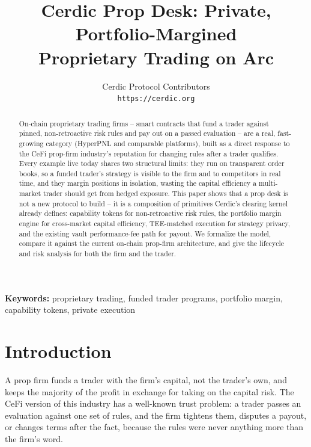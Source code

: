 \documentclass[11pt,a4paper]{article}
\title{
  \vspace{-1.5cm}
  \textbf{Cerdic Prop Desk: Private, Portfolio-Margined\\[4pt]
  Proprietary Trading on Arc}
  \vspace{-0.3cm}
}
\author{
  Cerdic Protocol Contributors\\[4pt]
  \texttt{https://cerdic.org}
}
\date{}
\begin{document}
\maketitle
\thispagestyle{empty}
\vspace{0.3cm}

\begin{abstract}
  \noindent On-chain proprietary trading firms -- smart contracts that fund a trader
  against pinned, non-retroactive risk rules and pay out on a passed evaluation -- are a
  real, fast-growing category (HyperPNL and comparable platforms), built as a direct
  response to the CeFi prop-firm industry's reputation for changing rules after a trader
  qualifies. Every example live today shares two structural limits: they run on transparent
  order books, so a funded trader's strategy is visible to the firm and to competitors
  in real time, and they margin positions in isolation, wasting the capital efficiency a
  multi-market trader should get from hedged exposure. This paper shows that a prop desk
  is not a new protocol to build -- it is a composition of primitives Cerdic's clearing
  kernel already defines: capability tokens for non-retroactive risk rules, the portfolio
  margin engine for cross-market capital efficiency, TEE-matched execution for strategy
  privacy, and the existing vault performance-fee path for payout. We formalize the model,
  compare it against the current on-chain prop-firm architecture, and give the lifecycle
  and risk analysis for both the firm and the trader.
\end{abstract}

\vspace{0.2cm}
\noindent\textbf{Keywords:} proprietary trading, funded trader programs, portfolio margin,
capability tokens, private execution

\newpage
\tableofcontents
\newpage

\section{Introduction}
\label{sec:introduction}

A prop firm funds a trader with the firm's capital, not the trader's own, and keeps the
majority of the profit in exchange for taking on the capital risk. The CeFi version of this
industry has a well-known trust problem: a trader passes an evaluation against one set of
rules, and the firm tightens them, disputes a payout, or changes terms after the fact,
because the rules were never anything more than the firm's word.
\end{document}
